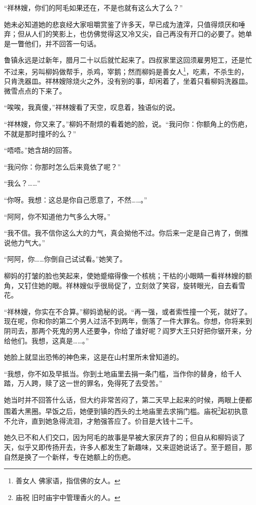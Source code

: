 \par “祥林嫂，你们的阿毛如果还在，不是也就有这么大了么？”
\par 她未必知道她的悲哀经大家咀嚼赏鉴了许多天，早已成为渣滓，只值得烦厌和唾弃；但从人们的笑影上，也仿佛觉得这又冷又尖，自己再没有开口的必要了。她单是一瞥他们，并不回答一句话。
\par 鲁镇永远是过新年，腊月二十以后就忙起来了。四叔家里这回须雇男短工，还是忙不过来，另叫柳妈做帮手，杀鸡，宰鹅；然而柳妈是善女人\footnote{善女人 佛家语，指信佛的女人。}，吃素，不杀生的，只肯洗器皿。祥林嫂除烧火之外，没有别的事，却闲着了，坐着只看柳妈洗器皿。微雪点点的下来了。
\par “唉唉，我真傻，”祥林嫂看了天空，叹息着，独语似的说。
\par “祥林嫂，你又来了。”柳妈不耐烦的看着她的脸，说。“我问你：你额角上的伤疤，不就是那时撞坏的么？”
\par “唔唔。”她含胡的回答。
\par “我问你：你那时怎么后来竟依了呢？”
\par “我么？……”
\par “你呀。我想：这总是你自己愿意了，不然……。”
\par “阿阿，你不知道他力气多么大呀。”
\par “我不信。我不信你这么大的力气，真会拗他不过。你后来一定是自己肯了，倒推说他力气大。”
\par “阿阿，你……你倒自己试试看。”她笑了。
\par 柳妈的打皱的脸也笑起来，使她蹙缩得像一个核桃；干枯的小眼睛一看祥林嫂的额角，又钉住她的眼。祥林嫂似乎很局促了，立刻敛了笑容，旋转眼光，自去看雪花。
\par “祥林嫂，你实在不合算。”柳妈诡秘的说。“再一强，或者索性撞一个死，就好了。现在呢，你和你的第二个男人过活不到两年，倒落了一件大罪名。你想，你将来到阴司去，那两个死鬼的男人还要争，你给了谁好呢？阎罗大王只好把你锯开来，分给他们。我想，这真是……。”
\par 她脸上就显出恐怖的神色来，这是在山村里所未曾知道的。
\par “我想，你不如及早抵当。你到土地庙里去捐一条门槛，当作你的替身，给千人踏，万人跨，赎了这一世的罪名，免得死了去受苦。”
\par 她当时并不回答什么话，但大约非常苦闷了，第二天早上起来的时候，两眼上便都围着大黑圈。早饭之后，她便到镇的西头的土地庙里去求捐门槛。庙祝\footnote{庙祝 旧时庙宇中管理香火的人。}起初执意不允许，直到她急得流泪，才勉强答应了。价目是大钱十二千。
\par 她久已不和人们交口，因为阿毛的故事是早被大家厌弃了的；但自从和柳妈谈了天，似乎又即传扬开去，许多人都发生了新趣味，又来逗她说话了。至于题目，那自然是换了一个新样，专在她额上的伤疤。

